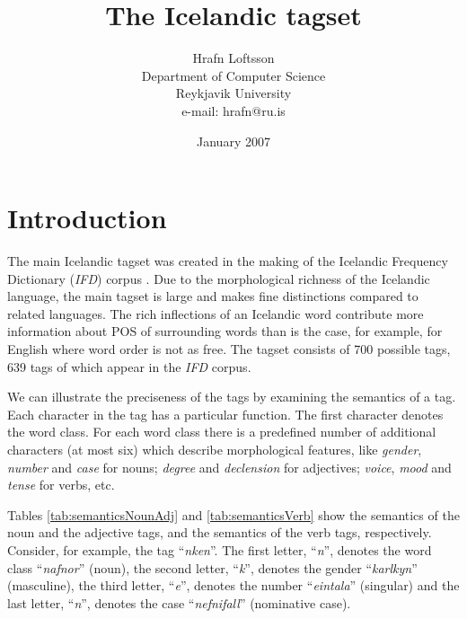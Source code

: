 \documentclass[11pt]{article}
\title{The Icelandic tagset}
\author{Hrafn Loftsson \\
        Department of Computer Science \\
        Reykjavik University \\
        e-mail: hrafn@ru.is \\
        }
\begin{document}
\label{firstpage}
\date{January 2007}
\maketitle

\section{Introduction}
\label{sec:tagset}
The main Icelandic tagset was created in the making of the Icelandic Frequency Dictionary (\emph{IFD}) corpus \citep{pin91}.
Due to the morphological richness of the Icelandic language, the main tagset is large and makes fine distinctions compared to related languages.
The rich inflections of an Icelandic word contribute more information about POS of surrounding words than is the case, for example, for English where word order is not as free.
The tagset consists of 700 possible tags, 639 tags of which appear in the \emph{IFD} corpus.

We can illustrate the preciseness of the tags by examining the semantics of a tag.
Each character in the tag has a particular function.
The first character denotes the word class.
For each word class there is a predefined number of additional characters (at most six) which describe morphological features, like \emph{gender}, \emph{number} and \emph{case} for nouns; \emph{degree} and \emph{declension} for adjectives; \emph{voice}, \emph{mood} and \emph{tense} for verbs, etc.

Tables \ref{tab:semanticsNounAdj} and \ref{tab:semanticsVerb} show the semantics of the noun and the adjective tags, and the semantics of the verb tags, respectively.
Consider, for example, the tag ``\emph{nken}''.  The first letter, ``\emph{n}'', denotes the word class ``\emph{nafnor{\dh}}'' (noun), the second letter, ``\emph{k}'', denotes the gender ``\emph{karlkyn}'' (masculine), the third letter, ``\emph{e}'', denotes the number ``\emph{eintala}'' (singular) and the last letter, ``\emph{n}'', denotes the case ``\emph{nefnifall}'' (nominative case).
\end{document}
